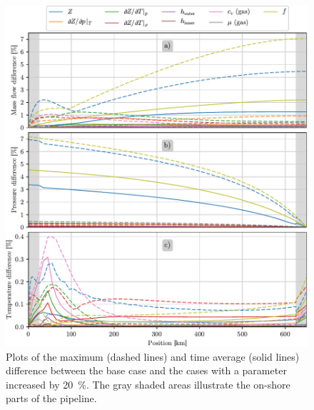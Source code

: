 \begin{figure}[!p]%
    \centering%
    \includegraphics{figures/difference_along_pipeline_shaded_abc.pdf}%
    \caption{%
        Plots of the maximum (dashed lines) and time average (solid lines) difference between the base case and the cases with a parameter increased by \SI{20}{\percent}. The gray shaded areas illustrate the on-shore parts of the pipeline.
        \label{fig:maxAndAverageForAll}%
    }%
\end{figure}%

